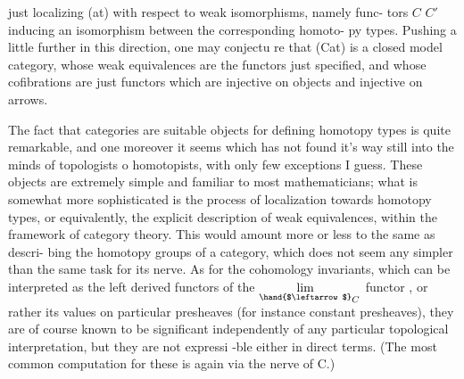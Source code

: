
just localizing (at) with respect to weak isomorphisms, namely func-%
tors $C$ \hand{$\to$} $C'$ inducing an isomorphism between the corresponding homoto-%
py types. Pushing a little further in this direction, one may conjectu%
re that (Cat) is a closed model category, whose weak equivalences are
the functors just specified, and whose cofibrations are just functors
which are injective on objects and injective on arrows.

The fact that categories are suitable objects for defining  homotopy
types is quite remarkable, and one moreover it seems which has not found
it's way still into the minds of topologists o homotopists, with only
few exceptions I guess. These objects are extremely simple and familiar
to most mathematicians; what is somewhat more sophisticated is the
process of localization towards homotopy types, or equivalently, the
explicit description of weak equivalences, within the framework of
 category theory. This would amount more or less to the same as descri-%
bing the homotopy groups of a category, which does not seem any simpler
than the same task for its nerve. As for the cohomology invariants, which
can be interpreted as the left derived functors of the $\underset{\hand{$\leftarrow$}}{\lim}_{C}$ functor ,
or rather its values on particular presheaves (for instance constant
presheaves), they are of course known to be significant\hand{,} independently
of any particular topological interpretation, but they are not expressi%
-ble either in direct terms. (The most common computation for these is
again via the nerve of C.)

